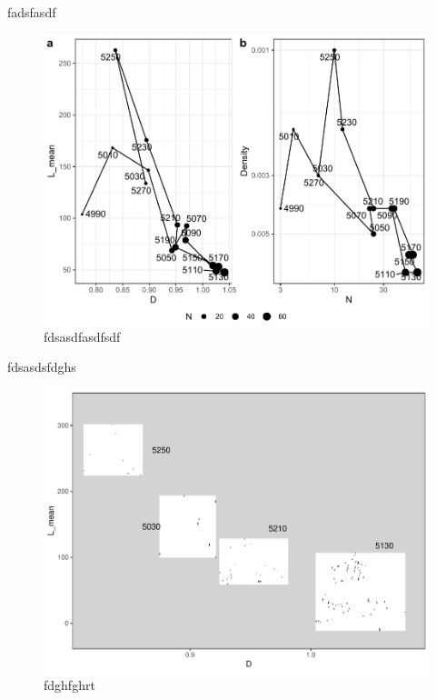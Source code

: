 \documentclass[
  12pt,
]{book}
\begin{document}
fadsfasdf



\begin{figure}

{\centering \includegraphics[width=0.9\linewidth]{bookdown-demo_files/figure-latex/09-time-points-1} 

}

\caption{fdsasdfasdfsdf}\label{fig:09-time-points}
\end{figure}

fdsasdsfdghs

\begin{figure}
\hypertarget{09-time}{%
\centering
\includegraphics{Results/fig09_time.pdf}
\caption{fdghfghrt}\label{09-time}
}
\end{figure}
\end{document}
